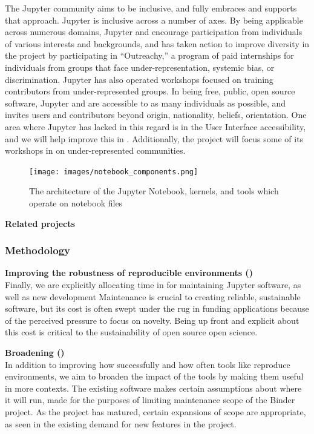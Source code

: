 The Jupyter community aims to be inclusive, and \TheProject fully
embraces and supports that approach.  Jupyter is inclusive across a number of axes.
By being applicable across numerous domains, Jupyter and \TheProject
encourage participation from individuals of various interests and
backgrounds, and has taken action to improve diversity in the project
by participating in ``Outreachy,'' a program of paid internships for
individuals from groups that face under-representation, systemic bias,
or discrimination.  Jupyter has also operated workshops focused on
training contributors from under-represented groups.  In being free,
public, open source software, Jupyter and \TheProject are accessible
to as many individuals as possible, and invites users and contributors
beyond origin, nationality, beliefs, orientation.  One area where
Jupyter has lacked in this regard is in the User Interface
accessibility, and we will help improve this in
.  Additionally, the project will
focus some of its workshops in
on
under-represented communities.


\begin{figure}[ht!]\centering
  \texttt{[image: images/notebook\_components.png]}
  \caption{The architecture of the Jupyter Notebook, kernels, and tools
        which operate on notebook files}
  \label{fig:notebook-architecture}
\end{figure}

\medskip
\noindent\textbf{Related projects}


\subsubsection{Methodology}\label{sec:methodology}

\textbf{Improving the robustness of reproducible environments ()}\\
Finally, we are explicitly allocating time in  for maintaining
Jupyter software, as well as new development
Maintenance is crucial to creating reliable, sustainable software,
but its cost is often swept under the rug in funding applications
because of the perceived pressure to focus on novelty.
Being up front and explicit about this cost is critical to the sustainability
of open source open science.

\medskip
\noindent\textbf{Broadening  ()}\\
In addition to improving how successfully and how often tools like \repotodocker{} reproduce environments,
we aim to broaden the impact of the tools by making them useful in more contexts.
The existing software makes certain assumptions about where it will run,
made for the purposes of limiting maintenance scope of the Binder project.
As the project has matured, certain expansions of scope are appropriate,
as seen in the existing demand for new features in the project.

